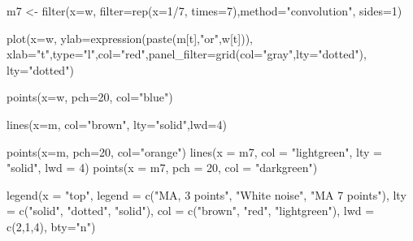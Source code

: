 \documentclass[
]{book}
\newenvironment{Shaded}{\begin{snugshade}}{\end{snugshade}}
\newcommand{\AttributeTok}[1]{\textcolor[rgb]{0.77,0.63,0.00}{#1}}
\newcommand{\DecValTok}[1]{\textcolor[rgb]{0.00,0.00,0.81}{#1}}
\newcommand{\FunctionTok}[1]{\textcolor[rgb]{0.00,0.00,0.00}{#1}}
\newcommand{\NormalTok}[1]{#1}
\newcommand{\OtherTok}[1]{\textcolor[rgb]{0.56,0.35,0.01}{#1}}
\newcommand{\SpecialCharTok}[1]{\textcolor[rgb]{0.00,0.00,0.00}{#1}}
\newcommand{\StringTok}[1]{\textcolor[rgb]{0.31,0.60,0.02}{#1}}
\theoremstyle{definition}
\theoremstyle{definition}
\theoremstyle{definition}
\theoremstyle{definition}
\theoremstyle{remark}
\begin{document}
\begin{Shaded}
\begin{Highlighting}[]
\NormalTok{m7 }\OtherTok{\textless{}{-}} \FunctionTok{filter}\NormalTok{(}\AttributeTok{x=}\NormalTok{w, }\AttributeTok{filter=}\FunctionTok{rep}\NormalTok{(}\AttributeTok{x=}\DecValTok{1}\SpecialCharTok{/}\DecValTok{7}\NormalTok{, }\AttributeTok{times=}\DecValTok{7}\NormalTok{),}\AttributeTok{method=}\StringTok{"convolution"}\NormalTok{, }\AttributeTok{sides=}\DecValTok{1}\NormalTok{)}

\FunctionTok{plot}\NormalTok{(}\AttributeTok{x=}\NormalTok{w, }\AttributeTok{ylab=}\FunctionTok{expression}\NormalTok{(}\FunctionTok{paste}\NormalTok{(m[t],}\StringTok{"or"}\NormalTok{,w[t])), }\AttributeTok{xlab=}\StringTok{"t"}\NormalTok{,}\AttributeTok{type=}\StringTok{"l"}\NormalTok{,}\AttributeTok{col=}\StringTok{"red"}\NormalTok{,}\AttributeTok{panel\_filter=}\FunctionTok{grid}\NormalTok{(}\AttributeTok{col=}\StringTok{"gray"}\NormalTok{,}\AttributeTok{lty=}\StringTok{"dotted"}\NormalTok{), }\AttributeTok{lty=}\StringTok{"dotted"}\NormalTok{)}

\FunctionTok{points}\NormalTok{(}\AttributeTok{x=}\NormalTok{w, }\AttributeTok{pch=}\DecValTok{20}\NormalTok{, }\AttributeTok{col=}\StringTok{"blue"}\NormalTok{)}

\FunctionTok{lines}\NormalTok{(}\AttributeTok{x=}\NormalTok{m, }\AttributeTok{col=}\StringTok{"brown"}\NormalTok{, }\AttributeTok{lty=}\StringTok{"solid"}\NormalTok{,}\AttributeTok{lwd=}\DecValTok{4}\NormalTok{)}

\FunctionTok{points}\NormalTok{(}\AttributeTok{x=}\NormalTok{m, }\AttributeTok{pch=}\DecValTok{20}\NormalTok{, }\AttributeTok{col=}\StringTok{"orange"}\NormalTok{)}
\FunctionTok{lines}\NormalTok{(}\AttributeTok{x =}\NormalTok{ m7, }\AttributeTok{col =} \StringTok{"lightgreen"}\NormalTok{, }\AttributeTok{lty =} \StringTok{"solid"}\NormalTok{, }\AttributeTok{lwd =} \DecValTok{4}\NormalTok{)}
\FunctionTok{points}\NormalTok{(}\AttributeTok{x =}\NormalTok{ m7, }\AttributeTok{pch =} \DecValTok{20}\NormalTok{, }\AttributeTok{col =} \StringTok{"darkgreen"}\NormalTok{)}

\FunctionTok{legend}\NormalTok{(}\AttributeTok{x =} \StringTok{"top"}\NormalTok{, }\AttributeTok{legend =} \FunctionTok{c}\NormalTok{(}\StringTok{"MA, 3 points"}\NormalTok{, }\StringTok{"White noise"}\NormalTok{, }\StringTok{"MA 7 points"}\NormalTok{),}
         \AttributeTok{lty =} \FunctionTok{c}\NormalTok{(}\StringTok{"solid"}\NormalTok{, }\StringTok{"dotted"}\NormalTok{, }\StringTok{"solid"}\NormalTok{), }\AttributeTok{col =} \FunctionTok{c}\NormalTok{(}\StringTok{"brown"}\NormalTok{, }\StringTok{"red"}\NormalTok{, }\StringTok{"lightgreen"}\NormalTok{),}
         \AttributeTok{lwd =} \FunctionTok{c}\NormalTok{(}\DecValTok{2}\NormalTok{,}\DecValTok{1}\NormalTok{,}\DecValTok{4}\NormalTok{), }\AttributeTok{bty=}\StringTok{"n"}\NormalTok{)}
\end{Highlighting}
\end{Shaded}
\end{document}
